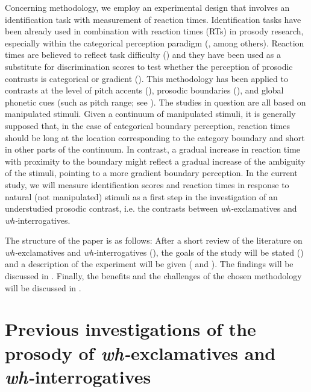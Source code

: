 \documentclass[output=paper]{langsci/langscibook}
\begin{document}
Concerning methodology, we employ an experimental design that involves an identification task with measurement of reaction times. Identification tasks have been already used in combination with reaction times (RTs) in prosody research, especially within the categorical perception paradigm (\citealt{Chen2003,Fale2006,Niebuhr2007,Feldhausen2011}, among others). Reaction times are believed to reflect task difficulty (\citealt{Massaro1987}) and they have been used as a substitute for discrimination scores to test whether the perception of prosodic contrasts is categorical or gradient (\citealt{Chen2003,Niebuhr2007}). This methodology has been applied to contrasts at the level of pitch accents (\citealt{Chen2003,Niebuhr2007,Feldhausen2011}), prosodic boundaries (\citealt{Schneider2011,Petrone2017}), and global phonetic cues (such as pitch range; see \citealt{Borras-Comes2010}). The studies in question are all based on manipulated stimuli. Given a continuum of manipulated stimuli, it is generally supposed that, in the case of categorical boundary perception, reaction times should be long at the location corresponding to the category boundary and short in other parts of the continuum. In contrast, a gradual increase in reaction time with proximity to the boundary might reflect a gradual increase of the ambiguity of the stimuli, pointing to a more gradient boundary perception. In the current study, we will measure identification scores and reaction times in response to natural (not manipulated) stimuli as a first step in the investigation of an understudied prosodic contrast, i.e. the contrasts between \textit{wh-}exclamatives and \textit{wh-}interrogatives.

The structure of the paper is as follows: After a short review of the literature on \textit{wh-}exclamatives and \textit{wh-}interrogatives (), the goals of the study will be stated () and a description of the experiment will be given ( and ). The findings will be discussed in . Finally, the benefits and the challenges of the chosen methodology will be discussed in .


\section{Previous investigations of the prosody of \textit{wh-}exclamatives and \textit{wh-}interrogatives}
\label{sec:kel:2}
\end{document}
